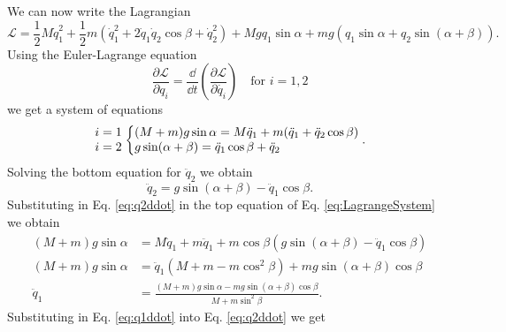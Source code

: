 We can now write the Lagrangian
\begin{equation}
    \mathcal{L} = \frac{1}{2} M \dot{q}_1^2 + \frac{1}{2} m (\dot{q}_1^2 + 2 \dot{q}_1 \dot{q}_2 \cos \beta + \dot{q}_2^2) + M g q_1 \sin \alpha + m g (q_1 \sin \alpha + q_2 \sin(\alpha + \beta)).
\end{equation}
Using the Euler-Lagrange equation
\begin{equation}
    \frac{\partial \mathcal{L}}{\partial q_i} = \frac{\dd }{\dd t} \left( \frac{\partial \mathcal{L}}{\partial \dot{q_i}} \right) \quad \text{for } i = 1, 2
\end{equation}
we get a system of equations
\begin{equation}
    \left.
        \begin{array}{@{}>{\displaystyle}l@{}}
            i = 1\\
            i = 2
        \end{array}
    \right.
    \left\{
        \begin{array}{@{}>{\displaystyle}l@{}}
            (M + m) g \sin \alpha = M \ddot{q}_1 + m (\ddot{q}_1 + \ddot{q}_2 \cos \beta)\\
            g \sin (\alpha + \beta) = \ddot{q}_1 \cos\beta + \ddot{q}_2
        \end{array}\label{eq:LagrangeSystem}
    \right..
\end{equation}
Solving the bottom equation for $\ddot{q}_2$ we obtain
\begin{equation}
    \ddot{q}_2 = g \sin (\alpha + \beta) - \ddot{q}_1 \cos \beta.\label{eq:q2ddot}
\end{equation}
Substituting in Eq. \eqref{eq:q2ddot} in the top equation of Eq. \eqref{eq:LagrangeSystem} we obtain
\begin{align}
    (M + m) g \sin \alpha &= M \ddot{q}_1 + m \ddot{q}_1 + m \cos \beta (g \sin (\alpha + \beta) - \ddot{q}_1 \cos\beta)\nonumber\\
    (M + m) g \sin \alpha &= \ddot{q}_1 (M + m - m \cos^2 \beta) + m g \sin(\alpha + \beta) \cos\beta \nonumber\\
    \ddot{q}_1 &= \frac{(M + m) g \sin \alpha - m g \sin(\alpha + \beta) \cos\beta}{M + m \sin^2 \beta}. \label{eq:q1ddot}
\end{align}
Substituting in Eq. \eqref{eq:q1ddot} into Eq. \eqref{eq:q2ddot} we get
